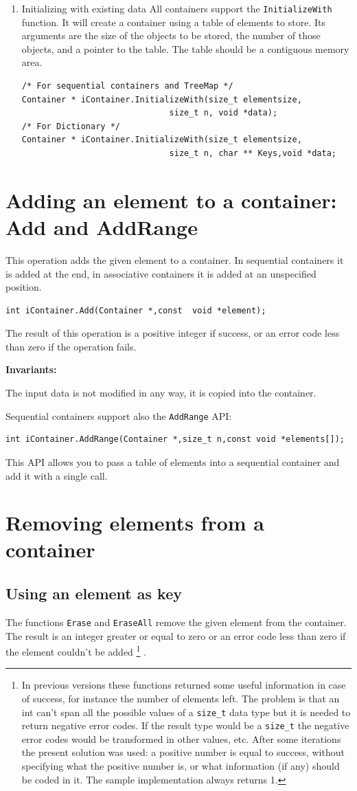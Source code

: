 \documentclass[12pt,a4paper]{memoir} %
\newcommand{\Const}{
{\par\noindent \textbf{Invariants:}\noindent}
}
\begin{document}
\begin{enumerate}
\item Initializing with existing data
All containers support the \verb,InitializeWith, function. It will create a container using a table of elements to store. Its arguments are the size of 
the objects to be stored, the number of those objects, and a pointer to the table. The table should be a contiguous memory area.
\begin{verbatim}
/* For sequential containers and TreeMap */
Container * iContainer.InitializeWith(size_t elementsize,
                              size_t n, void *data);
/* For Dictionary */
Container * iContainer.InitializeWith(size_t elementsize,
                              size_t n, char ** Keys,void *data;
\end{verbatim}


\end{enumerate}
\section{Adding an element to a container: Add and AddRange}
This operation adds the given element to a container. In sequential containers it is added at the end, in associative containers it is added at an unspecified position.
\begin{verbatim}
int iContainer.Add(Container *,const  void *element);
\end{verbatim}
The result of this operation is a positive integer if success, or an error code less than zero if the operation fails.
\Const The input data is not modified in any way, it is copied into the container.

Sequential containers support also the \texttt{AddRange} API:
\begin{verbatim}
int iContainer.AddRange(Container *,size_t n,const void *elements[]);
\end{verbatim}
This API allows you to pass a table of elements into a sequential container and add it with a single call.
\section{Removing elements from a container}
\subsection{Using an element as key}
The functions \texttt{Erase} and \texttt{EraseAll} remove the given element from the container. 
The result is an integer greater or equal to zero or an error code less than zero if the element couldn't be added
\footnote{In previous versions these functions returned some useful information in case of success, for instance the number of elements left. The problem is that an int can't span all the possible values of a \texttt{size\_t} data type but it is needed to return negative
error codes. If the result type would be a \texttt{size\_t} the negative error codes would be transformed in other values, etc. After some iterations 
the present solution was used: a positive number is equal to success, without specifying what the positive number is, or what information (if any) 
should be coded in it. The sample implementation always returns 1.} 
.
\end{document}
